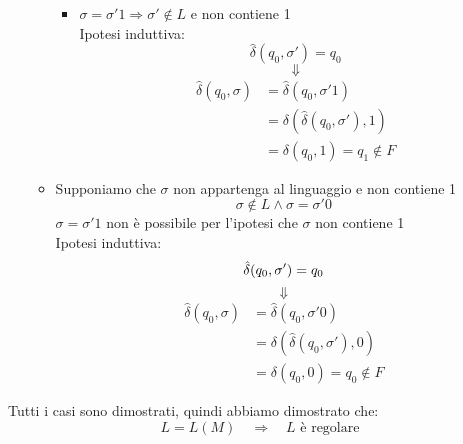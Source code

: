 \documentclass[a4paper]{article}
\begin{document}
\begin{example}
\begin{itemize}
\begin{itemize}
\begin{itemize}
            \item \( \sigma = \sigma'1 \Rightarrow \sigma' \notin L \) e non contiene 1\\
              \noindent
              Ipotesi induttiva:
              \[
                \hat{\delta}(q_0, \sigma') = q_0
              \] 
              \[
                \Downarrow
              \] 
              \[
                \begin{aligned}
                  \hat{\delta}(q_0, \sigma) &= \hat{\delta}(q_0, \sigma'1)\\
                                            &= \delta(\hat{\delta}(q_0, \sigma'), 1)\\
                                            &= \delta(q_0, 1) = q_1 \notin F
                \end{aligned}
              \] 
          \end{itemize}

        \item Supponiamo che \( \sigma  \) non appartenga al linguaggio e non contiene 1
          \[
            \sigma \notin L \wedge  \sigma  = \sigma'0
          \] 
          \( \sigma = \sigma'1 \) non è possibile per l'ipotesi che \( \sigma  \) non contiene 1\\
          \noindent
          Ipotesi induttiva:
          \[
              \hat{\delta}(q_0, \sigma') = q_0\\
          \] 
          \[
            \Downarrow
          \] 
          \[
            \begin{aligned}
              \hat{\delta}(q_0, \sigma) &= \hat{\delta}(q_0, \sigma'0)\\
                                        &= \delta(\hat{\delta}(q_0, \sigma'), 0)\\
                                        &= \delta(q_0, 0) = q_0 \notin F
            \end{aligned}
          \] 
      \end{itemize}
  \end{itemize}
  Tutti i casi sono dimostrati, quindi abbiamo dimostrato che:
  \[
    L = L(M) \quad \Rightarrow \quad L \text{ è regolare}
  \]
\end{example}
\end{document}
